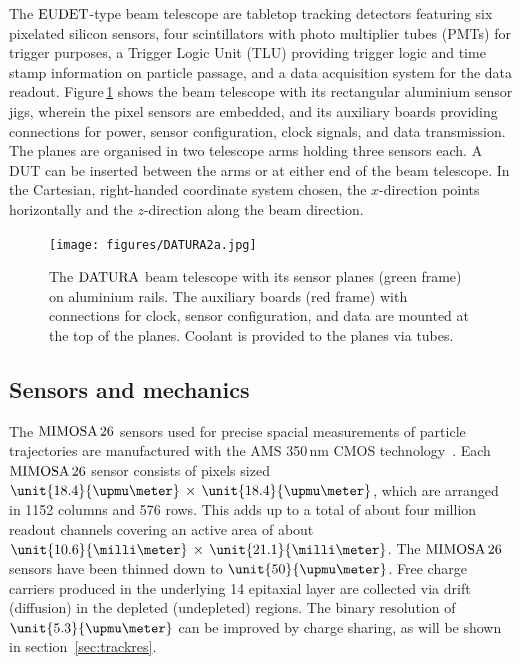 
The $\textrm{EUDET}$-type beam telescope are tabletop tracking detectors featuring six pixelated silicon sensors, four scintillators with photo multiplier tubes (PMTs) for trigger purposes,
 a Trigger Logic Unit (TLU) providing trigger logic and time stamp information on particle passage, and a data acquisition system for the data readout. 
Figure\,\ref{fig:datura-tscope} shows the beam telescope with its rectangular aluminium sensor jigs, wherein the pixel sensors are embedded,
 and its auxiliary boards providing connections for power, sensor configuration, clock signals, and data transmission. 
The planes are organised in two telescope arms holding three sensors each. 
A DUT can be inserted between the arms or at either end of the beam telescope. 
In the Cartesian, right-handed coordinate system chosen, the $x$-direction points horizontally and the $z$-direction along the beam direction.

\begin{figure}[tb]
	\center
	\texttt{[image: figures/DATURA2a.jpg]}
	\caption[The $\Datura$ telescope]{The $\Datura$ beam telescope with its sensor planes (green frame) on aluminium rails.
	The auxiliary boards (red frame) with connections for clock, sensor configuration, and data are mounted at the top of the planes.
	Coolant is provided to the planes via tubes.}
	\label{fig:datura-tscope}
\end{figure}
 
\subsection{Sensors and mechanics}
\label{sec:sensors}

The $\textrm{MIMOSA\,26}$ sensors used for precise spacial measurements of particle trajectories are manufactured with the AMS 350\,nm CMOS technology~\cite{HuGuo2010480}. 
Each $\textrm{MIMOSA\,26}$ sensor consists of pixels sized $\unit{18.4}{\upmu\meter}\,\times\,\unit{18.4}{\upmu\meter}$, which are arranged in 1152 columns and 576 rows.
This adds up to a total of about four million readout channels covering an active area of about $\unit{10.6}{\milli\meter}\,\times\,\unit{21.1}{\milli\meter}$. 
The $\textrm{MIMOSA\,26}$ sensors have been thinned down to $\unit{50}{\upmu\meter}$. 
Free charge carriers produced in the underlying \unit{14}{\upmu\meter} epitaxial layer are collected via drift (diffusion) in the depleted (undepleted) regions. 
The binary resolution of $\unit{5.3}{\upmu\meter}$ can be improved by charge sharing, as will be shown in section~\ref{sec:trackres}.

